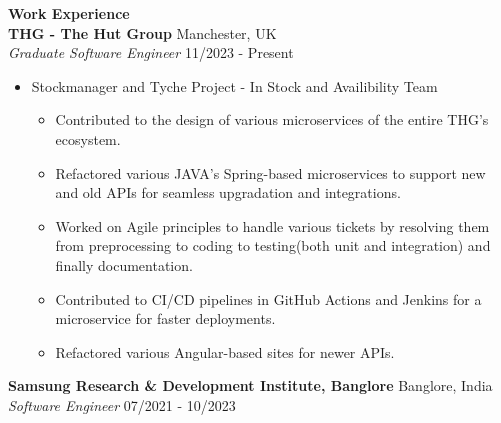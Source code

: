 \documentclass{article}
\begin{document}
\noindent \large \textbf{\textcolor{NavyBlue}{Work Experience}} \vspace{3pt} \\
\noindent \normalsize \textbf{THG - The Hut Group} \hfill Manchester, UK \\
\textit{Graduate Software Engineer} \hfill 11/2023 - Present
\begin{itemize}[noitemsep,nolistsep,leftmargin=*]
    \item {\normalsize {Stockmanager and Tyche Project - In Stock and Availibility Team }
        \begin{itemize}
            \item Contributed to the design of various microservices of the entire THG's ecosystem.
            \item Refactored various JAVA's Spring-based microservices to support new and old APIs for seamless upgradation and integrations.
            \item Worked on Agile principles to handle various tickets by resolving them from preprocessing to coding to testing(both unit and integration) and finally documentation.
            \item Contributed to CI/CD pipelines in GitHub Actions and Jenkins for a microservice for faster deployments.
            \item Refactored various Angular-based sites for newer APIs.
        \end{itemize}
    }
\end{itemize}
\noindent \normalsize \textbf{Samsung Research \& Development Institute, Banglore} \hfill Banglore, India \\
\textit{Software Engineer} \hfill 07/2021 - 10/2023
\end{document}
